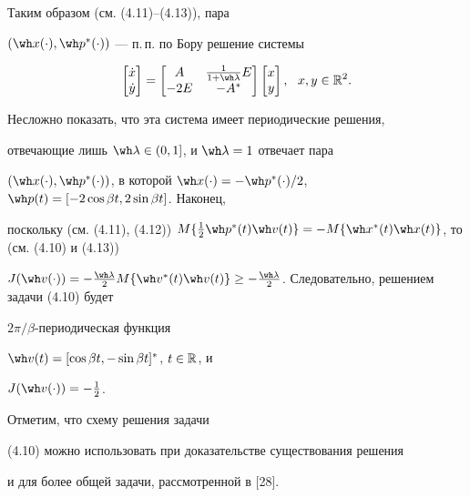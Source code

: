 \begin{exams}
\begin{equation}
\end{equation}





Таким образом (см. (4.11)--(4.13)), пара


$(\wh x(\cdot),\wh p{}^{*}(\cdot))$ --- п.\,п. по Бору решение системы


$$


\begin{bmatrix} \Dot x \\ \Dot y \end{bmatrix}=


\begin{bmatrix} A & \frac{1}{1+\wh\lambda} E \\


-2E & -A^* \end{bmatrix}


\begin{bmatrix} x \\ y \end{bmatrix},\ \ x, y\in\R^{2}.


$$


Несложно показать, что эта система имеет периодические решения,


отвечающие лишь $\wh\lambda\in(0,1]$, и $\wh\lambda=1$ отвечает пара


$(\wh x(\cdot),\wh p{}^{*}(\cdot))$, в которой $\wh x(\cdot)=


-\wh p{}^{*}(\cdot)/2$, $\wh p(t)=[-2\cos\beta t,2\sin\beta t]$. Наконец,


поскольку (см. (4.11), (4.12)) $M\{\frac{1}{2}\wh p{}^{*}(t)\wh v(t)\}=


-M\{\wh x^{*}(t)\wh x(t)\}$, то (см. (4.10) и (4.13))


$J(\wh v(\cdot))=-\frac{\wh\lambda}{2} M\{\wh v{}^{*}(t)\wh v(t)\}\ge


-\frac{\wh\lambda}{2}$. Следовательно, решением задачи (4.10) будет


$2\pi/\beta$-периодическая функция


$\wh v(t)=[\cos\beta t,-\sin\beta t]^{*}$, $t\in\Bbb R$, и


$J(\wh v(\cdot))=-\frac{1}{2}$.


\end{exams}





\begin{notes}


Отметим, что схему решения задачи


(4.10) можно использовать при доказательстве существования решения


и для более общей задачи, рассмотренной в [28].


\end{notes}





